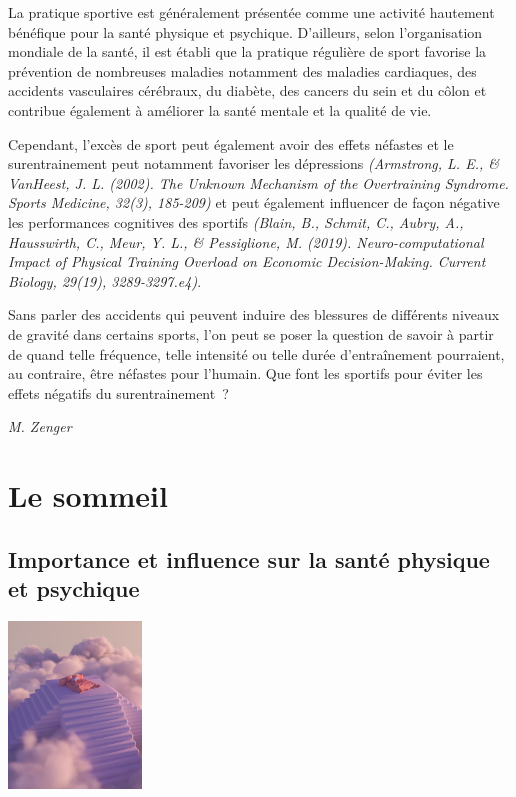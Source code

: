 \documentclass[
  10pt,
  french,
  a5paper,
  openany]{book}
\newenvironment{signature}{\begin{flushright}}{\end{flushright}}
\begin{document}
La pratique sportive est généralement présentée comme une activité hautement bénéfique pour la santé physique et psychique. D'ailleurs, selon l'organisation mondiale de la santé, il est établi que la pratique régulière de sport favorise la prévention de nombreuses maladies notamment des maladies cardiaques, des accidents vasculaires cérébraux, du diabète, des cancers du sein et du côlon et contribue également à améliorer la santé mentale et la qualité de vie.

Cependant, l'excès de sport peut également avoir des effets néfastes et le surentrainement peut notamment favoriser les dépressions \emph{(Armstrong, L. E., \& VanHeest, J. L. (2002). The Unknown Mechanism of the Overtraining Syndrome. Sports Medicine, 32(3), 185-209)} et peut également influencer de façon négative les performances cognitives des sportifs \emph{(Blain, B., Schmit, C., Aubry, A., Hausswirth, C., Meur, Y. L., \& Pessiglione, M. (2019). Neuro-computational Impact of Physical Training Overload on Economic Decision-Making. Current Biology, 29(19), 3289-3297.e4)}.

Sans parler des accidents qui peuvent induire des blessures de différents niveaux de gravité dans certains sports, l'on peut se poser la question de savoir à partir de quand telle fréquence, telle intensité ou telle durée d'entraînement pourraient, au contraire, être néfastes pour l'humain. Que font les sportifs pour éviter les effets négatifs du surentrainement~?

\begin{signature}
\emph{M. Zenger}

\end{signature}

\hypertarget{le-sommeil}{%
\chapter{Le sommeil}\label{le-sommeil}}

\hypertarget{importance-et-influence-sur-la-santuxe9-physique-et-psychique}{%
\section{Importance et influence sur la santé physique et psychique}\label{importance-et-influence-sur-la-santuxe9-physique-et-psychique}}

\begin{center}
\includegraphics[width=\textwidth,height=12em]{images/sommeil.jpg}

\end{center}
\end{document}
